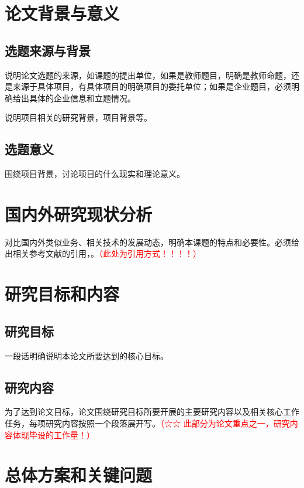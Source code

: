 \documentclass[a4paper,12pt]{article}
\begin{document}
\hypersetup{pageanchor=false}
\MakeCover
\ReportDecorationstrue
{}
\hypersetup{pageanchor=true}
\tableofcontents
{}

\section{论文背景与意义}
\subsection{选题来源与背景}
说明论文选题的来源，如课题的提出单位，如果是教师题目，明确是教师命题，还是来源于具体项目，有具体项目的明确项目的委托单位；如果是企业题目，必须明确给出具体的企业信息和立题情况。

说明项目相关的研究背景，项目背景等。


\subsection{选题意义}
围绕项目背景，讨论项目的什么现实和理论意义。


\section{国内外研究现状分析}
对比国内外类似业务、相关技术的发展动态，明确本课题的特点和必要性。必须给出相关参考文献的引用，\textcolor{red}{\cite{sample-a}}。\textcolor{red}{（此处为引用方式！！！！）}


\section{研究目标和内容}
\subsection{研究目标}
{\songlatin 一段话明确说明本论文所要达到的核心目标。\par}

\subsection{研究内容}
为了达到论文目标，论文围绕研究目标所要开展的主要研究内容以及相关核心工作任务，每项研究内容按照一个段落展开写。\textcolor{red}{（☆☆ 此部分为论文重点之一，研究内容体现毕设的工作量！）}


\section{总体方案和关键问题}
\end{document}

